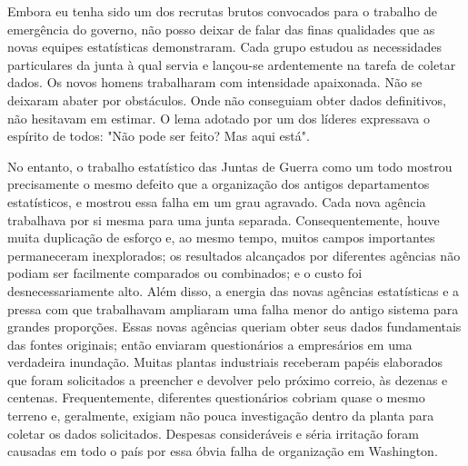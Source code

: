 \documentclass[12pt]{article}
\begin{document}
Embora eu tenha sido um dos recrutas brutos convocados para o trabalho de emergência do governo, não posso deixar de falar das finas qualidades que as novas equipes estatísticas demonstraram. Cada grupo estudou as necessidades particulares da junta à qual servia e lançou-se ardentemente na tarefa de coletar dados. Os novos homens trabalharam com intensidade apaixonada. Não se deixaram abater por obstáculos. Onde não conseguiam obter dados definitivos, não hesitavam em estimar. O lema adotado por um dos líderes expressava o espírito de todos: "Não pode ser feito? Mas aqui está".

No entanto, o trabalho estatístico das Juntas de Guerra como um todo mostrou precisamente o mesmo defeito que a organização dos antigos departamentos estatísticos, e mostrou essa falha em um grau agravado. Cada nova agência trabalhava por si mesma para uma junta separada. Consequentemente, houve muita duplicação de esforço e, ao mesmo tempo, muitos campos importantes permaneceram inexplorados; os resultados alcançados por diferentes agências não podiam ser facilmente comparados ou combinados; e o custo foi desnecessariamente alto. Além disso, a energia das novas agências estatísticas e a pressa com que trabalhavam ampliaram uma falha menor do antigo sistema para grandes proporções. Essas novas agências queriam obter seus dados fundamentais das fontes originais; então enviaram questionários a empresários em uma verdadeira inundação. Muitas plantas industriais receberam papéis elaborados que foram solicitados a preencher e devolver pelo próximo correio, às dezenas e centenas. Frequentemente, diferentes questionários cobriam quase o mesmo terreno e, geralmente, exigiam não pouca investigação dentro da planta para coletar os dados solicitados. Despesas consideráveis e séria irritação foram causadas em todo o país por essa óbvia falha de organização em Washington.
\end{document}
